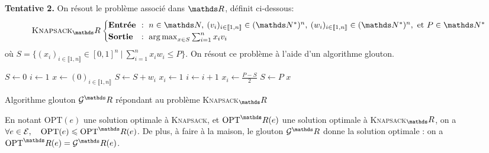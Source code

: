 \begin{exm}
	\textbf{Tentative 2.} On résout le problème associé dans $\R$, définit ci-dessous: \[
		\textsc{Knapsack}_\R\begin{cases}
			\text{\textbf{Entrée}} \!\!&:\ n \in \N,\: (v_i)_{i\in\llbracket 1,n \rrbracket} \in (\N^*)^n,\: (w_i)_{i\in\llbracket 1,n \rrbracket} \in (\N^*)^n, \text{ et } P \in \N^*\\
			\text{\textbf{Sortie}} \!\!&:\ \argmax_{x \in S} \sum_{i=1}^n x_i v_i
		\end{cases}
	\] où $S = \Big\{(x_i)_{i\in\llbracket 1,n \rrbracket} \in [0,1]^n\:\Big|\:\sum_{i=1}^n x_i w_i \le P \Big\}$.
	On résout ce problème à l'aide d'un algorithme glouton.
	\begin{algorithm}[H]
		\centering
		\begin{algorithmic}[1]
			\State $S \gets 0$
			\State $i \gets 1$
			\State $x \gets (0)_{i\in\llbracket 1,n \rrbracket}$
			\State $S \gets S + w_i$
			\State $x_i \gets 1$
			\State $i \gets i + 1$
			\EndWhile
			\State $x_i \gets \frac{P - S}{2}$
			\State $S \gets P$
			\EndIf
			\State \Return $x$
		\end{algorithmic}
		\caption{Algorithme glouton $\mathcal{G}^\R$ répondant au problème \textsc{Knapsack}$_\R$}
	\end{algorithm}
	En notant $\mathrm{OPT}(e)$\/ une solution optimale à \textsc{Knapsack}, et $\mathrm{OPT}^\R(e)$\/ une solution optimale à \textsc{Knapsack}$_\R$, on a $\forall e \in \mathcal{E},\quad \mathrm{OPT}(e) \le \mathrm{OPT}^\R(e)$. De plus, à faire à la maison, le glouton $\mathcal{G}^\R$\/ donne la solution optimale : on a $\mathrm{OPT}^\R(e) = \mathcal{G}^\R(e)$.


\end{exm}
